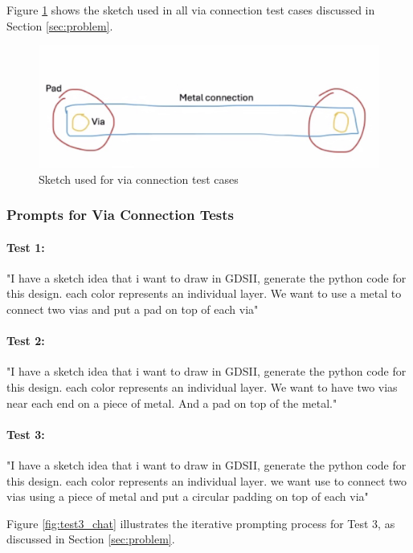 \documentclass{article}
\begin{document}
Figure \ref{fig:sketch} shows the sketch used in all via connection test cases discussed in Section \ref{sec:problem}.

\begin{figure}[h]
\centering
\includegraphics[width=0.5\linewidth]{sketch.png}
\caption{Sketch used for via connection test cases}
\label{fig:sketch}
\end{figure}

\subsubsection{Prompts for Via Connection Tests}
\label{appendix:via_prompts}

\paragraph{Test 1:} "I have a sketch idea that i want to draw in GDSII, generate the python code for this design. each color represents an individual layer. We want to use a metal to connect two vias and put a pad on top of each via"

\paragraph{Test 2:} "I have a sketch idea that i want to draw in GDSII, generate the python code for this design. each color represents an individual layer. We want to have two vias near each end on a piece of metal. And a pad on top of the metal."

\paragraph{Test 3:} "I have a sketch idea that i want to draw in GDSII, generate the python code for this design. each color represents an individual layer. we want use to connect two vias using a piece of metal and put a circular padding on top of each via"

Figure \ref{fig:test3_chat} illustrates the iterative prompting process for Test 3, as discussed in Section \ref{sec:problem}.
\end{document}

